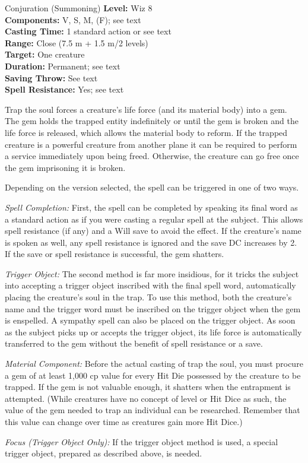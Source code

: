 {Conjuration (Summoning)}
{
	\textbf{Level:}
	Wiz 8\\
	\textbf{Components:}
	V, S, M, (F); see text\\
	\textbf{Casting Time:}
	1 standard action or see text\\
	\textbf{Range:}
	Close (7.5 m + 1.5 m/2 levels)\\
	\textbf{Target:}
	One creature\\
	\textbf{Duration:}
	Permanent; see text\\
	\textbf{Saving Throw:}
	See text\\
	\textbf{Spell Resistance:}
	Yes; see text\\
}
{
	Trap the soul forces a creature's life force (and its material body) into a gem. The gem holds the trapped entity indefinitely or until the gem is broken and the life force is released, which allows the material body to reform. If the trapped creature is a powerful creature from another plane it can be required to perform a service immediately upon being freed. Otherwise, the creature can go free once the gem imprisoning it is broken.

	Depending on the version selected, the spell can be triggered in one of two ways.

	\textit{Spell Completion:}
	First, the spell can be completed by speaking its final word as a standard action as if you were casting a regular spell at the subject. This allows spell resistance (if any) and a Will save to avoid the effect. If the creature's name is spoken as well, any spell resistance is ignored and the save DC increases by 2. If the save or spell resistance is successful, the gem shatters.

	\textit{Trigger Object:}
	The second method is far more insidious, for it tricks the subject into accepting a trigger object inscribed with the final spell word, automatically placing the creature's soul in the trap. To use this method, both the creature's name and the trigger word must be inscribed on the trigger object when the gem is enspelled. A sympathy spell can also be placed on the trigger object. As soon as the subject picks up or accepts the trigger object, its life force is automatically transferred to the gem without the benefit of spell resistance or a save.

	\textit{Material Component:}
	Before the actual casting of trap the soul, you must procure a gem of at least 1,000 cp value for every Hit Die possessed by the creature to be trapped. If the gem is not valuable enough, it shatters when the entrapment is attempted. (While creatures have no concept of level or Hit Dice as such, the value of the gem needed to trap an individual can be researched. Remember that this value can change over time as creatures gain more Hit Dice.)

	\textit{Focus (Trigger Object Only):}
	If the trigger object method is used, a special trigger object, prepared as described above, is needed.

}
